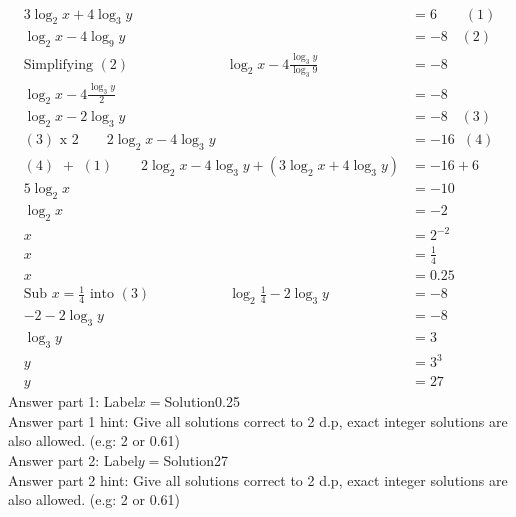 \documentclass{article}
\begin{document}
\\[-35pt]\begin{align*}
3\log_{2}x+4\log_{3}y&=6\qquad (1)\\[2pt]
\log_{2}x-4\log_{9}y&=-8\hspace{11pt}(2)\\[2pt]
\text{Simplifying}\,\,(2)\hspace{83pt}\log_{2}x-4\displaystyle\frac{\log_{3}y}{\log_{3}9}&=-8\\[2pt]
\log_{2}x-4\displaystyle\frac{\log_{3}y}{2}&=-8\\[2pt]
\log_{2}x-2\log_{3}y&=-8\hspace{11pt}(3)\\[2pt]
(3)\,\,\text{x}\,\,2\qquad 2\log_{2}x-4\log_{3}y&=-16\hspace{7pt}(4)\\[2pt]
(4)\,\,+\,\,(1)\qquad 2\log_{2}x-4\log_{3}y+(3\log_{2}x+4\log_{3}y)&=-16+6\\[2pt]
5\log_{2}x&=-10\\[2pt]
\log_{2}x&=-2\\[2pt]
x&=2^{-2}\\[2pt]
x&=\displaystyle\frac{1}{4}\\[2pt]
x&=0.25\\[12pt]
\text{Sub}\,\, x=\displaystyle\frac{1}{4}\,\,\text{into}\,\,(3)\hspace{67pt} \log_{2}\displaystyle\frac{1}{4}-2\log_{3}y&=-8\\[2pt]
-2-2\log_{3}y&=-8\\[2pt]
\log_{3}y&=3\\[2pt]
y&=3^3\\[2pt]
y&=27
\end{align*}
Answer part 1: \hspace{10pt}Label\hspace{10pt}$x=$\hspace{10pt}Solution\hspace{10pt}0.25\\
Answer part 1 hint: \hspace{15pt}Give all solutions correct to 2 d.p, exact integer solutions are also allowed. (e.g: 2 or 0.61)\\
Answer part 2: \hspace{10pt}Label\hspace{10pt}$y=$\hspace{10pt}Solution\hspace{10pt}27\\
Answer part 2 hint: \hspace{15pt}Give all solutions correct to 2 d.p, exact integer solutions are also allowed. (e.g: 2 or 0.61)\\
\end{document}
